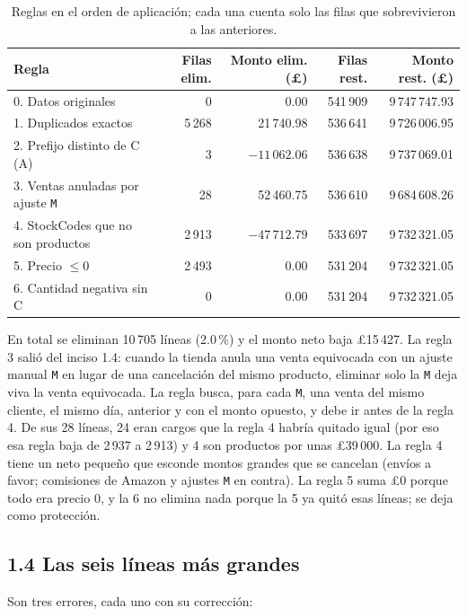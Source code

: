 \documentclass[11pt,letterpaper]{article}
\newcommand{\lib}{\pounds}
\begin{document}
\begin{table}[H]
\centering
\caption{Reglas en el orden de aplicación; cada una cuenta solo las filas que sobrevivieron a las anteriores.}
\small
\begin{tabular}{lrrrr}
\toprule
Regla & Filas elim. & Monto elim. (\lib) & Filas rest. & Monto rest. (\lib)\\
\midrule
0. Datos originales & 0 & 0.00 & 541\,909 & 9\,747\,747.93\\
1. Duplicados exactos & 5\,268 & 21\,740.98 & 536\,641 & 9\,726\,006.95\\
2. Prefijo distinto de C (A) & 3 & $-11\,062.06$ & 536\,638 & 9\,737\,069.01\\
3. Ventas anuladas por ajuste \texttt{M} & 28 & 52\,460.75 & 536\,610 & 9\,684\,608.26\\
4. StockCodes que no son productos & 2\,913 & $-47\,712.79$ & 533\,697 & 9\,732\,321.05\\
5. Precio $\le 0$ & 2\,493 & 0.00 & 531\,204 & 9\,732\,321.05\\
6. Cantidad negativa sin C & 0 & 0.00 & 531\,204 & 9\,732\,321.05\\
\bottomrule
\end{tabular}
\end{table}

En total se eliminan 10\,705 líneas (2.0\,\%) y el monto neto baja \lib15\,427. La regla 3 salió del inciso 1.4: cuando la tienda anula una venta equivocada con un ajuste manual \texttt{M} en lugar de una cancelación del mismo producto, eliminar solo la \texttt{M} deja viva la venta equivocada. La regla busca, para cada \texttt{M}, una venta del mismo cliente, el mismo día, anterior y con el monto opuesto, y debe ir antes de la regla 4. De sus 28 líneas, 24 eran cargos que la regla 4 habría quitado igual (por eso esa regla baja de 2\,937 a 2\,913) y 4 son productos por unas \lib39\,000. La regla 4 tiene un neto pequeño que esconde montos grandes que se cancelan (envíos a favor; comisiones de Amazon y ajustes \texttt{M} en contra). La regla 5 suma \lib0 porque todo era precio 0, y la 6 no elimina nada porque la 5 ya quitó esas líneas; se deja como protección.

\subsection*{1.4 Las seis líneas más grandes}

Son tres errores, cada uno con su corrección:
\end{document}
